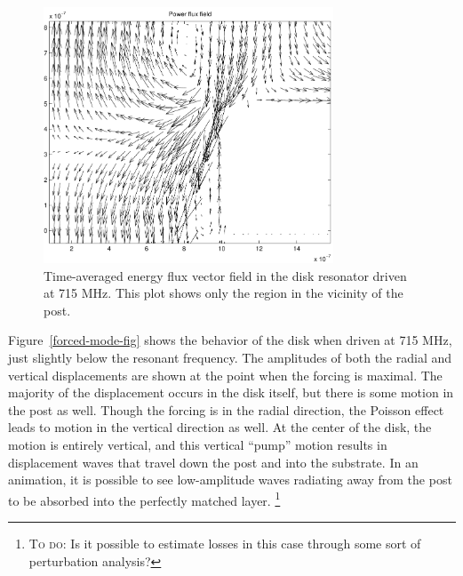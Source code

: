 \documentclass{article}
\newcommand{\note}[1]{\footnote{\textsc{To do}: #1}}
\begin{document}
\begin{figure}
\begin{center}
\includegraphics[height=3in]{power715a.pdf}
\end{center}
\caption{Time-averaged energy flux vector field in the disk
         resonator driven at 715 MHz.  This plot shows only the
         region in the vicinity of the post.}
\label{forced-flux-fig}
\end{figure}

Figure~\ref{forced-mode-fig} shows the behavior of the disk when
driven at 715 MHz, just slightly below the resonant frequency.  The
amplitudes of both the radial and vertical displacements are shown at
the point when the forcing is maximal.  The majority of the
displacement occurs in the disk itself, but there is some motion in
the post as well.  Though the forcing is in the radial direction, the
Poisson effect leads to motion in the vertical direction as well.  At
the center of the disk, the motion is entirely vertical, and this
vertical ``pump'' motion results in displacement waves that travel
down the post and into the substrate.  In an animation, it is possible
to see low-amplitude waves radiating away from the post to be absorbed
into the perfectly matched layer.
\note{Is it possible to estimate losses in this case through some
  sort of perturbation analysis?}
\end{document}
